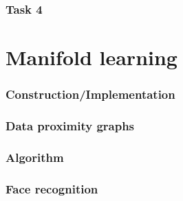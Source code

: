 \documentclass[a4paper, 11pt]{article}
\begin{document}
\section{Task 4}

\pagebreak
\part*{Manifold learning}
\section*{Construction/Implementation}
\lipsum[5]

\section*{Data proximity graphs}
\lipsum[6]

\section*{Algorithm}
\lipsum[7]

\section*{Face recognition}



\end{document}
